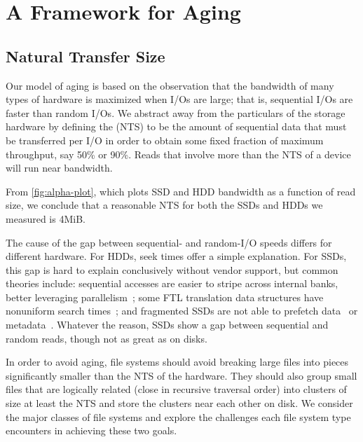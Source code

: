 \section{A Framework for Aging}\label{sec:fsa-framework}

\subsection{Natural Transfer Size}\label{sec:fsa-nts}

Our model of aging is based on the observation that the bandwidth of many types
of hardware is maximized when I/Os are large; that is, sequential I/Os are
faster than random I/Os.  We abstract away from the particulars of the storage
hardware by defining the  (NTS) to be the amount of
sequential data that must be transferred per I/O in order to obtain some fixed
fraction of maximum throughput, say 50\% or 90\%.  Reads that involve more than
the NTS of a device will run near bandwidth.

From \cref{fig:alpha-plot}, which plots SSD and HDD bandwidth as a
function of read size, we conclude that a reasonable NTS for both the SSDs and
HDDs we measured is 4MiB.

The cause of the gap between sequential- and random-I/O speeds differs for
different hardware.  For HDDs, seek times offer a simple explanation.  For
SSDs, this gap is hard to explain conclusively without vendor support, but
common theories include: sequential accesses are easier to stripe across
internal banks, better leveraging
parallelism~\cite{DBLP:conf/sigmetrics/JungK13}; some FTL translation data
structures have nonuniform search times~\cite{DBLP:journals/csur/MaFL14}; and
fragmented SSDs are not able to prefetch
data~\cite{DBLP:conf/sigmetrics/ChenKZ09} or
metadata~\cite{DBLP:conf/hotstorage/JiCSWLX16}.  Whatever the reason, SSDs show
a gap between sequential and random reads, though not as great as on disks.

In order to avoid aging, file systems should avoid breaking large files into
pieces significantly smaller than the NTS of the hardware. They should also
group small files that are logically related (close in recursive traversal
order) into clusters of size at least the NTS and store the clusters near each
other on disk.  We consider the major classes of file systems and explore the
challenges each file system type encounters in achieving these two goals.

\newcommand{\addalphaplot}[3]
{
  \addplot[color=#2, line width=0.75pt, mark=#3]
  table[x=read_size_bytes, y expr=\thisrow{read_size_bytes} * \thisrow{num_reads} / \thisrow{time_seconds} / 1000000] {fsa-data/device_measurements/#1_alpha_bw.csv};
}

